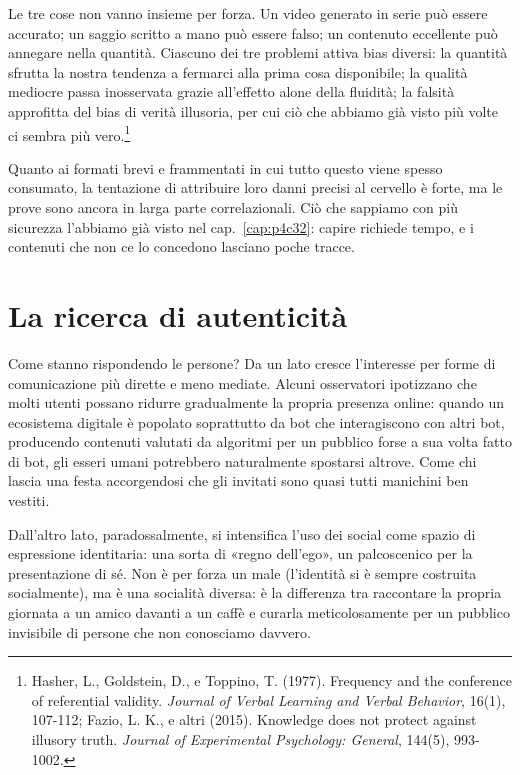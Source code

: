 Le tre cose non vanno insieme per forza. Un video generato in serie può essere accurato; un saggio scritto a mano può essere falso; un contenuto eccellente può annegare nella quantità. Ciascuno dei tre problemi attiva bias diversi: la quantità sfrutta la nostra tendenza a fermarci alla prima cosa disponibile; la qualità mediocre passa inosservata grazie all'effetto alone della fluidità; la falsità approfitta del bias di verità illusoria, per cui ciò che abbiamo già visto più volte ci sembra più vero.\footnote{Hasher, L., Goldstein, D., e Toppino, T. (1977). Frequency and the conference of referential validity. \textit{Journal of Verbal Learning and Verbal Behavior}, 16(1), 107-112; Fazio, L. K., e altri (2015). Knowledge does not protect against illusory truth. \textit{Journal of Experimental Psychology: General}, 144(5), 993-1002.}

Quanto ai formati brevi e frammentati in cui tutto questo viene spesso consumato, la tentazione di attribuire loro danni precisi al cervello è forte, ma le prove sono ancora in larga parte correlazionali. Ciò che sappiamo con più sicurezza l'abbiamo già visto nel cap.~\ref{cap:p4c32}: capire richiede tempo, e i contenuti che non ce lo concedono lasciano poche tracce.

\section{La ricerca di autenticità}

Come stanno rispondendo le persone? Da un lato cresce l'interesse per forme di comunicazione più dirette e meno mediate. Alcuni osservatori ipotizzano che molti utenti possano ridurre gradualmente la propria presenza online: quando un ecosistema digitale è popolato soprattutto da bot che interagiscono con altri bot, producendo contenuti valutati da algoritmi per un pubblico forse a sua volta fatto di bot, gli esseri umani potrebbero naturalmente spostarsi altrove. Come chi lascia una festa accorgendosi che gli invitati sono quasi tutti manichini ben vestiti.



Dall'altro lato, paradossalmente, si intensifica l'uso dei social come spazio di espressione identitaria: una sorta di «regno dell'ego», un palcoscenico per la presentazione di sé. Non è per forza un male (l'identità si è sempre costruita socialmente), ma è una socialità diversa: è la differenza tra raccontare la propria giornata a un amico davanti a un caffè e curarla meticolosamente per un pubblico invisibile di persone che non conosciamo davvero.

